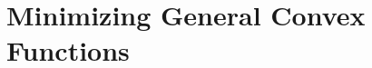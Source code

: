 \documentclass[openany]{book}
\theoremstyle{definition}
\theoremstyle{remark}
\begin{document}
\section{Minimizing General Convex Functions}\label{sec:GDConv}
\begin{comment}
In this section, we consider minimizing a general convex function $f:C\to \mathbb{R}$ (where $C$ is closed convex) with no more assumption. Let us first analyze some general iterative process.

The information we have during the first $T$ steps include $x^{(t)}$, $f(x^{(t)})$, and $\nabla f(x^{(t)})$, for $1\le t\le T$. Let $\overline{f}_t$ denote the function for which $\overline{f}_t(x^{(t)})=f(x^{(t)})$, while $\overline{f}_t(x)=\infty$ for $x\ne x^{(t)}$. The best upper bound of $f$ we can construct is $\overline{f}=\mathbf{conv}\,\inf_{1\le t\le T}\overline{f}_t$. The reason is that, for any $1\le t\le T$, $(\nabla f(x^{(t)}),-1)$ gives a supporting hyperplane to $\mathbf{epi}\,f$ at $(x^{(t)},f(x^{(t)}))$. Now since $\mathbf{epi}\,\overline{f}\subset \mathbf{epi}\,f$, $(\nabla f(x^{(t)}),-1)$ also gives a supporting hyperplane to $\mathbf{epi}\,\overline{f}$ at $(x^{(t)},f(x^{(t)}))$. In other words, $\nabla f(x^{(t)})$ is a subgradient of $\overline{f}$ at $x^{(t)}$.

Let $\underline{f}_t(x)=f(x^{(t)})+\langle\nabla f(x^{(t)}),x-x^{(t)}\rangle=\langle\nabla f(x^{(t)}),x\rangle-f^*(\nabla f(x^{(t)}))$, and $\underline{f}=\sup_{1\le t\le T}\underline{f}_t$. Then $\underline{f}$ is the best lower bound of $f$ we have after $T$ steps.

Now to measure how good our solution is, we need some comparison. One natural benchmark is $\inf_{x\in \mathbb{R}^n}f(x)$. However, $f$ might be unbounded below. Even if it is bounded below, we might never be able to estimate its infimum based on zeroth and first order information (just consider the exponential or logistic function). Thus in the general setting, it is reasonable to compare the solution $\tilde{x}$ output by our algorithm with some general reference point $x$.

Now we consider an arbitrary reference point $x$. We want to find an upper bound for $f(\tilde{x})-f(x)$, where $\tilde{x}$ is the solution given by our algorithm. One can give the tightest bound by considering any convex function between $\overline{f}$ and $\underline{f}$, but it is unclear how to do this job. Furthermore, since $x$ is arbitrary, it is actually also often tight to consider $\overline{f}(\tilde{x})-\underline{f}(x)$. Also, if we want to give some guarantee, in the current case we should have $\tilde{x}\in \mathbf{conv}\,\{x^{(1)},\ldots,x^{(T)}\}$ due to the upper bound $\overline{f}$.


\end{comment}
\end{document}
